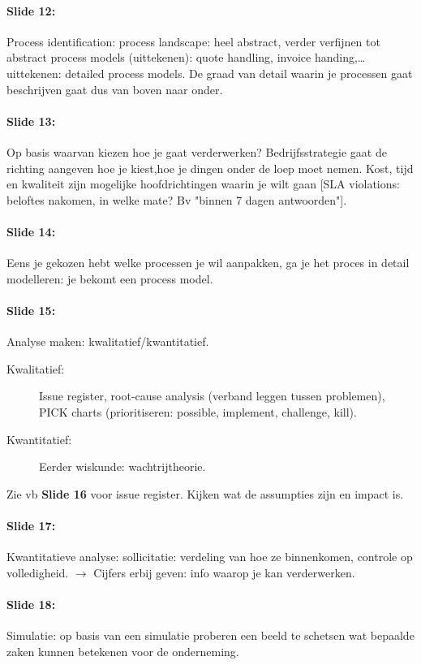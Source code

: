 \documentclass[10pt,a4paper]{report}
\begin{document}
\paragraph{Slide 12:}Process identification: process landscape: heel abstract, verder verfijnen tot abstract process models (uittekenen): quote handling, invoice handing,… uittekenen: detailed process models. De graad van detail waarin je processen gaat beschrijven gaat dus van boven naar onder.

\paragraph{Slide 13:}Op basis waarvan kiezen hoe je gaat verderwerken? Bedrijfsstrategie gaat de richting aangeven hoe je kiest,hoe je dingen onder de loep moet nemen. Kost, tijd en kwaliteit zijn mogelijke hoofdrichtingen waarin je wilt gaan [SLA violations: beloftes nakomen, in welke mate? Bv "binnen 7 dagen antwoorden"].

\paragraph{Slide 14:}Eens je gekozen hebt welke processen je wil aanpakken, ga je het proces in detail modelleren: je bekomt een process model.

\paragraph{Slide 15:}Analyse maken: kwalitatief/kwantitatief. 
\begin{description}
\item[Kwalitatief:] Issue register, root-cause analysis (verband leggen tussen problemen), PICK charts (prioritiseren: possible, implement, challenge, kill).
\item[Kwantitatief:] Eerder wiskunde: wachtrijtheorie.
\end{description}
Zie vb \textbf{Slide 16} voor issue register. Kijken wat de assumpties zijn en impact is.

\paragraph{Slide 17:}Kwantitatieve analyse: sollicitatie: verdeling van hoe ze binnenkomen, controle op volledigheid. $\rightarrow$ Cijfers erbij geven: info waarop je kan verderwerken.

\paragraph{Slide 18:}Simulatie: op basis van een simulatie proberen een beeld te schetsen wat bepaalde zaken kunnen betekenen voor de onderneming.
\end{document}
